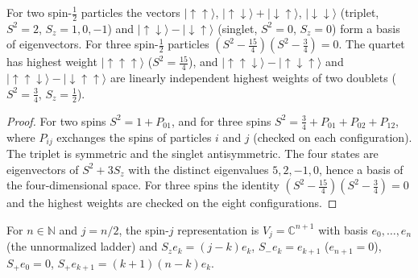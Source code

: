 \begin{theorem}\label{thm:clebsch-gordan}
  \leanok
  For two spin-$\tfrac12$ particles the vectors $|{\uparrow\uparrow}\rangle$, $|{\uparrow\downarrow}\rangle+|{\downarrow\uparrow}\rangle$,
  $|{\downarrow\downarrow}\rangle$ (triplet, $S^2=2$, $S_z=1,0,-1$) and $|{\uparrow\downarrow}\rangle-|{\downarrow\uparrow}\rangle$
  (singlet, $S^2=0$, $S_z=0$) form a basis of eigenvectors. For three spin-$\tfrac12$ particles
  $(S^2-\tfrac{15}4)(S^2-\tfrac34)=0$. The quartet has highest weight $|{\uparrow\uparrow\uparrow}\rangle$ ($S^2=\tfrac{15}4$), and
  $|{\uparrow\uparrow\downarrow}\rangle-|{\uparrow\downarrow\uparrow}\rangle$ and $|{\uparrow\uparrow\downarrow}\rangle-|{\downarrow\uparrow\uparrow}\rangle$
  are linearly independent highest weights of two doublets ($S^2=\tfrac34$, $S_z=\tfrac12$).
\end{theorem}
\begin{proof}\leanok
  For two spins $S^2=1+P_{01}$, and for three spins $S^2=\tfrac34+P_{01}+P_{02}+P_{12}$, where $P_{ij}$ exchanges the spins of
  particles $i$ and $j$ (checked on each configuration). The triplet is symmetric and the singlet antisymmetric. The four
  states are eigenvectors of $S^2+3S_z$ with the distinct eigenvalues $5,2,-1,0$, hence a basis of the four-dimensional
  space. For three spins the identity $(S^2-\tfrac{15}4)(S^2-\tfrac34)=0$ and the highest weights are checked on the eight
  configurations.
\end{proof}

\begin{definition}\label{def:spin-rep}
  \leanok
  For $n\in\mathbb N$ and $j=n/2$, the spin-$j$ representation is $V_j=\mathbb C^{n+1}$ with basis $e_0,\dots,e_n$ (the
  unnormalized ladder) and $S_ze_k=(j-k)e_k$, $S_-e_k=e_{k+1}$ ($e_{n+1}=0$), $S_+e_0=0$, $S_+e_{k+1}=(k+1)(n-k)e_k$.
\end{definition}

